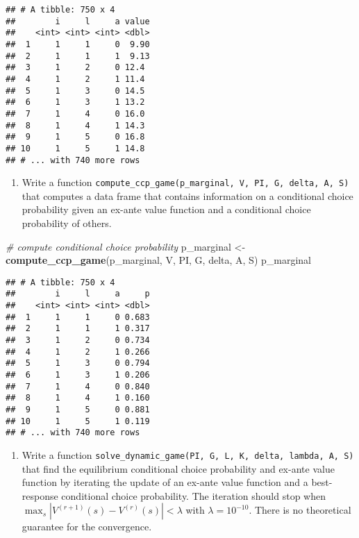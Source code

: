 \documentclass[
]{book}
\newenvironment{Shaded}{\begin{snugshade}}{\end{snugshade}}
\newcommand{\CommentTok}[1]{\textcolor[rgb]{0.56,0.35,0.01}{\textit{#1}}}
\newcommand{\KeywordTok}[1]{\textcolor[rgb]{0.13,0.29,0.53}{\textbf{#1}}}
\newcommand{\NormalTok}[1]{#1}
\newcommand{\StringTok}[1]{\textcolor[rgb]{0.31,0.60,0.02}{#1}}
\providecommand{\tightlist}{%
  \setlength{\itemsep}{0pt}\setlength{\parskip}{0pt}}
\begin{document}
\begin{verbatim}
## # A tibble: 750 x 4
##        i     l     a value
##    <int> <int> <int> <dbl>
##  1     1     1     0  9.90
##  2     1     1     1  9.13
##  3     1     2     0 12.4 
##  4     1     2     1 11.4 
##  5     1     3     0 14.5 
##  6     1     3     1 13.2 
##  7     1     4     0 16.0 
##  8     1     4     1 14.3 
##  9     1     5     0 16.8 
## 10     1     5     1 14.8 
## # ... with 740 more rows
\end{verbatim}

\begin{enumerate}
\def\labelenumi{\arabic{enumi}.}
\setcounter{enumi}{9}
\tightlist
\item
  Write a function \texttt{compute\_ccp\_game(p\_marginal,\ V,\ PI,\ G,\ delta,\ A,\ S)} that computes a data frame that contains information on a conditional choice probability given an ex-ante value function and a conditional choice probability of others.
\end{enumerate}

\begin{Shaded}
\begin{Highlighting}[]
\CommentTok{# compute conditional choice probability }
\NormalTok{p_marginal <-}\StringTok{ }\KeywordTok{compute_ccp_game}\NormalTok{(p_marginal, V, PI, G, delta, A, S)}
\NormalTok{p_marginal}
\end{Highlighting}
\end{Shaded}

\begin{verbatim}
## # A tibble: 750 x 4
##        i     l     a     p
##    <int> <int> <int> <dbl>
##  1     1     1     0 0.683
##  2     1     1     1 0.317
##  3     1     2     0 0.734
##  4     1     2     1 0.266
##  5     1     3     0 0.794
##  6     1     3     1 0.206
##  7     1     4     0 0.840
##  8     1     4     1 0.160
##  9     1     5     0 0.881
## 10     1     5     1 0.119
## # ... with 740 more rows
\end{verbatim}

\begin{enumerate}
\def\labelenumi{\arabic{enumi}.}
\setcounter{enumi}{10}
\tightlist
\item
  Write a function \texttt{solve\_dynamic\_game(PI,\ G,\ L,\ K,\ delta,\ lambda,\ A,\ S)} that find the equilibrium conditional choice probability and ex-ante value function by iterating the update of an ex-ante value function and a best-response conditional choice probability. The iteration should stop when \(\max_s|V^{(r + 1)}(s) - V^{(r)}(s)| < \lambda\) with \(\lambda = 10^{-10}\). There is no theoretical guarantee for the convergence.
\end{enumerate}
\end{document}
